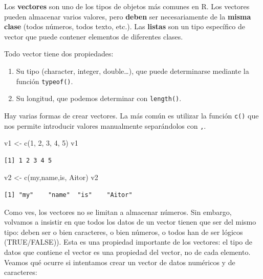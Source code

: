 \documentclass[
  letterpaper,
  DIV=11,
  numbers=noendperiod]{scrreprt}
\newenvironment{Shaded}{\begin{snugshade}}{\end{snugshade}}
\newcommand{\DecValTok}[1]{\textcolor[rgb]{0.68,0.00,0.00}{#1}}
\newcommand{\FunctionTok}[1]{\textcolor[rgb]{0.28,0.35,0.67}{#1}}
\newcommand{\NormalTok}[1]{\textcolor[rgb]{0.00,0.23,0.31}{#1}}
\newcommand{\OtherTok}[1]{\textcolor[rgb]{0.00,0.23,0.31}{#1}}
\newcommand{\StringTok}[1]{\textcolor[rgb]{0.13,0.47,0.30}{#1}}
\providecommand{\tightlist}{%
  \setlength{\itemsep}{0pt}\setlength{\parskip}{0pt}}\usepackage{longtable,booktabs,array}
\begin{document}
Los \textbf{vectores} son uno de los tipos de objetos más comunes en R.
Los vectores pueden almacenar varios valores, pero \textbf{deben} ser
necesariamente de la \textbf{misma clase} (todos números, todos texto,
etc.). Las \textbf{listas} son un tipo específico de vector que puede
contener elementos de diferentes clases.

Todo vector tiene dos propiedades:

\begin{enumerate}
\def\labelenumi{\arabic{enumi}.}
\tightlist
\item
  Su tipo (character, integer, double\ldots), que puede determinarse
  mediante la función \texttt{typeof()}.
\item
  Su longitud, que podemos determinar con \texttt{length()}.
\end{enumerate}

Hay varias formas de crear vectores. La más común es utilizar la función
\texttt{c()} que nos permite introducir valores manualmente separándolos
con \texttt{,}.

\begin{Shaded}
\begin{Highlighting}[]
\NormalTok{v1 }\OtherTok{\textless{}{-}} \FunctionTok{c}\NormalTok{(}\DecValTok{1}\NormalTok{, }\DecValTok{2}\NormalTok{, }\DecValTok{3}\NormalTok{, }\DecValTok{4}\NormalTok{, }\DecValTok{5}\NormalTok{)}
\NormalTok{v1}
\end{Highlighting}
\end{Shaded}

\begin{verbatim}
[1] 1 2 3 4 5
\end{verbatim}

\begin{Shaded}
\begin{Highlighting}[]
\NormalTok{v2 }\OtherTok{\textless{}{-}} \FunctionTok{c}\NormalTok{(}\StringTok{\textquotesingle{}my\textquotesingle{}}\NormalTok{,}\StringTok{\textquotesingle{}name\textquotesingle{}}\NormalTok{,}\StringTok{\textquotesingle{}is\textquotesingle{}}\NormalTok{, }\StringTok{\textquotesingle{}Aitor\textquotesingle{}}\NormalTok{)}
\NormalTok{v2}
\end{Highlighting}
\end{Shaded}

\begin{verbatim}
[1] "my"    "name"  "is"    "Aitor"
\end{verbatim}

Como ves, los vectores no se limitan a almacenar números. Sin embargo,
volvamos a insistir en que todos los datos de un vector tienen que ser
del mismo tipo: deben ser o bien caracteres, o bien números, o todos han
de ser lógicos (TRUE/FALSE)). Esta es una propiedad importante de los
vectores: el tipo de datos que contiene el vector es una propiedad del
vector, no de cada elemento. Veamos qué ocurre si intentamos crear un
vector de datos numéricos y de caracteres:
\end{document}

